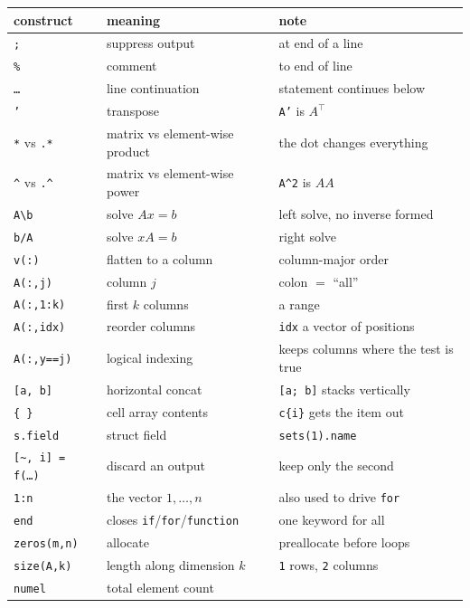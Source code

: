 \begin{center}
\small
\begin{tabular}{llp{6.4cm}}
\toprule
construct & meaning & note \\
\midrule
\texttt{;} & suppress output & at end of a line \\
\texttt{\%} & comment & to end of line \\
\texttt{\ldots} & line continuation & statement continues below \\
\texttt{'} & transpose & \texttt{A'} is $A^{\!\top}$ \\
\texttt{*} vs \texttt{.*} & matrix vs element-wise product & the dot changes everything \\
\texttt{\textasciicircum} vs \texttt{.\textasciicircum} & matrix vs element-wise power & \texttt{A\textasciicircum2} is $AA$ \\
\texttt{A\textbackslash b} & solve $Ax=b$ & left solve, no inverse formed \\
\texttt{b/A} & solve $xA=b$ & right solve \\
\texttt{v(:)} & flatten to a column & column-major order \\
\texttt{A(:,j)} & column $j$ & colon $=$ ``all'' \\
\texttt{A(:,1:k)} & first $k$ columns & a range \\
\texttt{A(:,idx)} & reorder columns & \texttt{idx} a vector of positions \\
\texttt{A(:,y==j)} & logical indexing & keeps columns where the test is true \\
\texttt{[a, b]} & horizontal concat & \texttt{[a; b]} stacks vertically \\
\texttt{\{ \}} & cell array contents & \texttt{c\{i\}} gets the item out \\
\texttt{s.field} & struct field & \texttt{sets(1).name} \\
\texttt{[\textasciitilde, i] = f(\ldots)} & discard an output & keep only the second \\
\texttt{1:n} & the vector $1,\ldots,n$ & also used to drive \texttt{for} \\
\texttt{end} & closes \texttt{if}/\texttt{for}/\texttt{function} & one keyword for all \\
\midrule
\texttt{zeros(m,n)} & allocate & preallocate before loops \\
\texttt{size(A,k)} & length along dimension $k$ & \texttt{1} rows, \texttt{2} columns \\
\texttt{numel} & total element count & \\

\end{tabular}
\end{center}
